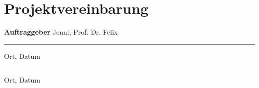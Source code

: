 \section{Projektvereinbarung}
\textbf{Auftraggeber}
Jenni, Prof. Dr. Felix
\bigskip
\hrule
Ort, Datum
\bigskip
\hrule
Ort, Datum

